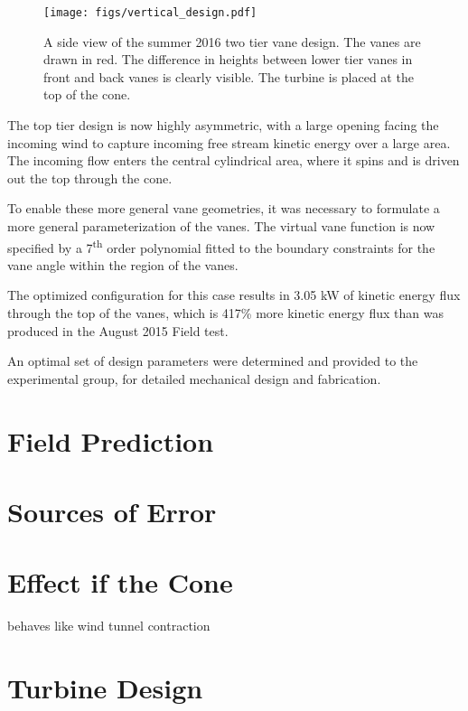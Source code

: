 \begin{figure}[!htb]
  \begin{center}
   \texttt{[image: figs/vertical\_design.pdf]}
   \caption{A side view of the summer 2016 two tier vane design. The
     vanes are drawn in red. The difference in heights between lower
     tier vanes in front and back vanes is clearly visible. The turbine
     is placed at the top of the cone.}
   \label{fig:vertical_design}
  \end{center}
 \end{figure}

The top tier design is now highly asymmetric, with a
large opening facing the incoming wind to capture incoming free stream
kinetic energy over a large area. The incoming flow enters the central
cylindrical area, where it spins and is driven out the top through the
cone. 

To enable these more general vane geometries, it was necessary to
formulate a more general parameterization of the vanes. The virtual vane 
function is now specified by a 7\textsuperscript{th} order polynomial
fitted to the boundary constraints for the vane angle within the region
of the vanes.

The optimized configuration for this case results in 3.05 kW of kinetic
energy flux through the top of the vanes, which is 417\% more kinetic
energy flux than was produced in the August 2015 Field test.

An optimal set of design parameters were determined and provided to the
experimental group, for detailed mechanical design and
fabrication.



\section{Field Prediction}
\label{subsec:field_predict}

\section{Sources of Error}

\section{Effect if the Cone}

behaves like wind tunnel contraction

\section{Turbine Design}


